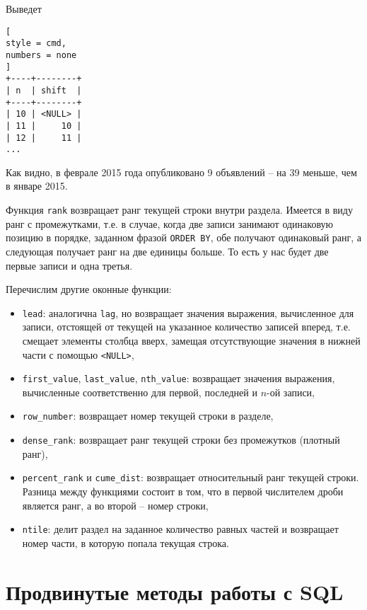 \documentclass[%
	11pt,
	a4paper,
	utf8,
		]{article}
\begin{document}
Выведет
\begin{lstlisting}[
style = cmd,
numbers = none
]
+----+--------+
| n  | shift  |
+----+--------+
| 10 | <NULL> |
| 11 |     10 |
| 12 |     11 |
...
\end{lstlisting}

Как видно, в феврале 2015 года опубликовано 9 объявлений -- на 39 меньше, чем в январе 2015.

Функция \texttt{rank} возвращает ранг текущей строки внутри раздела. Имеется в виду ранг с промежутками, т.е. в случае, когда две записи занимают одинаковую позицию в порядке, заданном фразой \texttt{ORDER BY}, обе получают одинаковый ранг, а следующая получает ранг на две единицы больше. То есть у нас будет две первые записи и одна третья.

Перечислим другие оконные функции:
\begin{itemize}
	\item \texttt{lead}: аналогична \texttt{lag}, но возвращает значения выражения, вычисленное для записи, отстоящей от текущей на указанное количество записей вперед, т.е. смещает элементы столбца вверх, замещая отсутствующие значения в нижней части с помощью \texttt{<NULL>},
	
	\item \texttt{first\_value}, \texttt{last\_value}, \texttt{nth\_value}: возвращает значения выражения, вычисленные соответственно для первой, последней и $ n $-ой записи,
	
	\item \texttt{row\_number}: возвращает номер текущей строки в разделе,
	
	\item \texttt{dense\_rank}: возвращает ранг текущей строки без промежутков (плотный ранг),
	
	\item \texttt{percent\_rank} и \texttt{cume\_dist}: возвращает относительный ранг текущей строки. Разница между функциями состоит в том, что в первой числителем дроби является ранг, а во второй -- номер строки,
	
	\item \texttt{ntile}: делит раздел на заданное количество равных частей и возвращает номер части, в которую попала текущая строка.
\end{itemize}

\section{Продвинутые методы работы с SQL}
\end{document}
